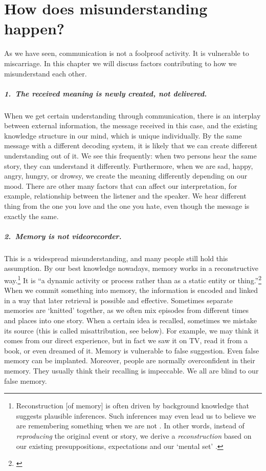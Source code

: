 \chapter{How does misunderstanding happen?}\label{chap:howmisunder}

As we have seen, communication is not a foolproof activity. It is vulnerable to miscarriage. In this chapter we will discuss factors contributing to how we misunderstand each other.

\paragraph*{1.\ The received meaning is newly created, not delivered.} When we get certain understanding through communication, there is an interplay between external information, the message received in this case, and the existing knowledge structure in our mind, which is unique individually. By the same message with a different decoding system, it is likely that we can create different understanding out of it. We see this frequently: when two persons hear the same story, they can understand it differently. Furthermore, when we are sad, happy, angry, hungry, or drowsy, we create the meaning differently depending on our mood. There are other many factors that can affect our interpretation, for example, relationship between the listener and the speaker. We hear different thing from the one you love and the one you hate, even though the message is exactly the same.

\paragraph*{2.\ Memory is not videorecorder.} This is a widespread misunderstanding, and many people still hold this assumption. By our best knowledge nowadays, memory works in a reconstructive way.\footnote{Reconstruction [of memory] is often driven by background knowledge that suggests plausible inferences. Such inferences may even lead us to believe we are remembering something when we are not \citep[p.~216]{baddeley:memory}. In other words, instead of \emph{reproducing} the original event or story, we derive a \emph{reconstruction} based on our existing presuppositions, expectations and our `mental set' \citep[p.~12]{foster:memory}.} It is ``a dynamic activity or process rather than as a static entity or thing.''\footnote{\citealp[p.~8]{foster:memory}} When we commit something into memory, the information is encoded and linked in a way that later retrieval is possible and effective. Sometimes separate memories are `knitted' together, as we often mix episodes from different times and places into one story. When a certain idea is recalled, sometimes we mistake its source (this is called misattribution, see below). For example, we may think it comes from our direct experience, but in fact we saw it on TV, read it from a book, or even dreamed of it. Memory is vulnerable to false suggestion. Even false memory can be implanted. Moreover, people are normally overconfident in their memory. They usually think their recalling is impeccable. We all are blind to our false memory.

